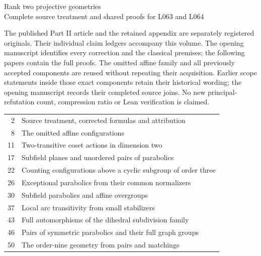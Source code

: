 \documentclass[11pt]{article}
\begin{document}
\begin{center}{\Large Rank two projective geometries}\\[4mm]
{\large Complete source treatment and shared proofs for L063 and L064}\end{center}
The published Part II article and the retained appendix are separately
registered originals. Their individual claim ledgers accompany this
volume. The opening manuscript identifies every correction and the
classical premises; the following papers contain the full proofs.
The omitted affine family and all previously accepted components are
reused without repeating their acquisition. Earlier scope statements
inside those exact components retain their historical wording; the
opening manuscript records their completed source joins. No new
principal-refutation count, compression ratio or Lean verification is
claimed.\par\medskip
\small\begin{tabular}{rp{}}
2 & Source treatment, corrected formulas and attribution\\
8 & The omitted affine configurations\\
11 & Two-transitive coset actions in dimension two\\
17 & Subfield planes and unordered pairs of parabolics\\
22 & Counting configurations above a cyclic subgroup of order three\\
26 & Exceptional parabolics from their common normalizers\\
30 & Subfield parabolics and affine overgroups\\
37 & Local arc transitivity from small stabilizers\\
43 & Full automorphisms of the dihedral subdivision family\\
46 & Pairs of symmetric parabolics and their full graph groups\\
50 & The order-nine geometry from pairs and matchings\\
\end{tabular}\newpage











\end{document}
